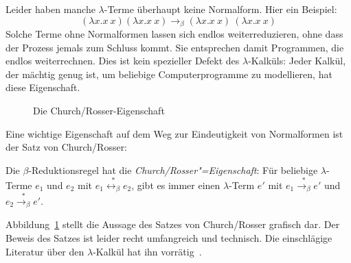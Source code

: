 Leider haben manche
$\lambda$-Terme überhaupt keine Normalform.  Hier ein
Beispiel:
%
\begin{displaymath}
  (\lambda x.x~x)(\lambda x.x~x) \rightarrow_\beta (\lambda x.x~x)~(\lambda x.x~x)
\end{displaymath}
%
Solche Terme ohne Normalformen lassen sich endlos weiterreduzieren,
ohne dass der Prozess jemals zum Schluss kommt.  Sie entsprechen damit
Programmen, die endlos weiterrechnen.
Dies ist kein spezieller Defekt des
$\lambda$-Kalküls: Jeder Kalkül, der mächtig genug ist, um beliebige
Computerprogramme zu modellieren, hat diese Eigenschaft.

\begin{figure}[tb]
  \begin{center}
    \caption{Die Church/Rosser-Eigenschaft}
    \label{fig:church-rosser}
  \end{center}
\end{figure}

Eine wichtige Eigenschaft auf dem Weg zur Eindeutigkeit von
Normalformen ist der Satz von Church/Rosser:
%
\begin{satz}
  \label{satz:church-rosser}
  Die $\beta$-Reduktionsregel hat die 
  \textit{Church/Rosser"=Eigenschaft}:  Für
  beliebige $\lambda$-Terme $e_1$ und  $e_2$ mit
  $e_1 \overset{\ast}{\leftrightarrow_\beta} e_2$,
  gibt es immer einen $\lambda$-Term $e'$ mit
  $e_1\overset{\ast}{\rightarrow_\beta} e'$ und
  $e_2\overset{\ast}{\rightarrow_\beta} e'$.
\end{satz}
%
Abbildung~\ref{fig:church-rosser} stellt die Aussage des Satzes von
Church/Rosser grafisch dar.
Der Beweis des Satzes ist leider recht umfangreich und technisch.
Die einschlägige Literatur über den $\lambda$-Kalkül hat ihn
vorrätig~\cite{HindleySeldin1986}.

